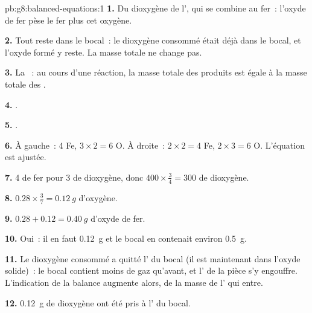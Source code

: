 \begin{solution}{pb:g8:balanced-equations:1}
\textbf{1.} Du dioxygène de l', qui se combine au fer~: l'oxyde de
fer pèse le fer plus cet oxygène.

\textbf{2.} Tout reste dans le bocal~: le dioxygène consommé était déjà
dans le bocal, et l'oxyde formé y reste. La masse totale ne change pas.

\textbf{3.} La ~: au cours d'une réaction, la
masse totale des produits est égale à la masse totale des .

\textbf{4.} .

\textbf{5.} .

\textbf{6.} À gauche~: 4 Fe, $3 \times 2 = 6$ O. À droite~:
$2 \times 2 = 4$ Fe, $2 \times 3 = 6$ O. L'équation est ajustée.

\textbf{7.} 4  de fer pour 3  de dioxygène, donc $400 \times
\frac{3}{4} = 300$  de dioxygène.

\textbf{8.} $0.28 \times \frac{3}{7} = \qty{0.12}{g}$ d'oxygène.

\textbf{9.} $0.28 + 0.12 = \qty{0.40}{g}$ d'oxyde de fer.

\textbf{10.} Oui~: il en faut \qty{0.12}{g} et le bocal en contenait
environ \qty{0.5}{g}.

\textbf{11.} Le dioxygène consommé a quitté l' du bocal (il est
maintenant dans l'oxyde solide)~: le bocal contient moins de gaz
qu'avant, et l' de la pièce s'y engouffre. L'indication de la balance
augmente alors, de la masse de l' qui entre.

\textbf{12.} \qty{0.12}{g} de dioxygène ont été pris à l' du bocal.
\end{solution}
